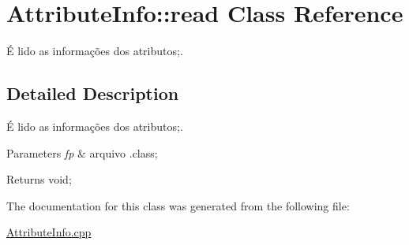 \hypertarget{class_attribute_info_1_1read}{}\section{Attribute\+Info\+:\+:read Class Reference}
\label{class_attribute_info_1_1read}


É lido as informações dos atributos;.  




\subsection{Detailed Description}
É lido as informações dos atributos;. 


\begin{DoxyParams}{Parameters}
{\em fp} & arquivo .class; \\
\hline
\end{DoxyParams}
\begin{DoxyReturn}{Returns}
void; 
\end{DoxyReturn}


The documentation for this class was generated from the following file\+:\begin{DoxyCompactItemize}
\item 
\hyperlink{_attribute_info_8cpp}{Attribute\+Info.\+cpp}\end{DoxyCompactItemize}
